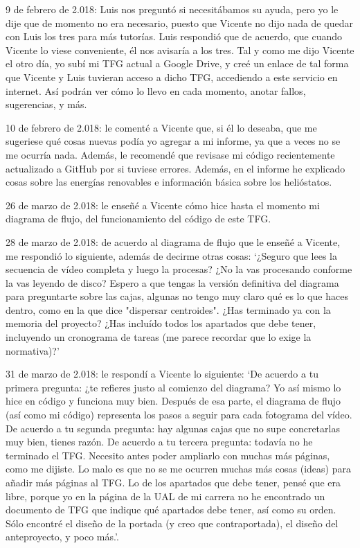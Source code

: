 \documentclass[12pt]{article}
\begin{document}
9 de febrero de 2.018: Luis nos preguntó si necesitábamos su ayuda, pero yo le dije que de momento no era necesario, puesto que Vicente no dijo nada de quedar con Luis los tres para más tutorías. Luis respondió que de acuerdo, que cuando Vicente lo viese conveniente, él nos avisaría a los tres. Tal y como me dijo Vicente el otro día, yo subí mi TFG actual a Google Drive, y creé un enlace de tal forma que Vicente y Luis tuvieran acceso a dicho TFG, accediendo a este servicio en internet. Así podrán ver cómo lo llevo en cada momento, anotar fallos, sugerencias, y más.

10 de febrero de 2.018: le comenté a Vicente que, si él lo deseaba, que me sugeriese qué cosas nuevas podía yo agregar a mi informe, ya que a veces no se me ocurría nada. Además, le recomendé que revisase mi código recientemente actualizado a GitHub por si tuviese errores. Además, en el informe he explicado cosas sobre las energías renovables e información básica sobre los helióstatos.

26 de marzo de 2.018: le enseñé a Vicente cómo hice hasta el momento mi diagrama de flujo, del funcionamiento del código de este TFG.

28 de marzo de 2.018: de acuerdo al diagrama de flujo que le enseñé a Vicente, me respondió lo siguiente, además de decirme otras cosas: ‘¿Seguro que lees la secuencia de vídeo completa y luego la procesas? ¿No la vas procesando conforme la vas leyendo de disco? Espero a que tengas la versión definitiva del diagrama para preguntarte sobre las cajas, algunas no tengo muy claro qué es lo que haces dentro, como en la que dice "dispersar centroides". ¿Has terminado ya con la memoria del proyecto? ¿Has incluído todos los apartados que debe tener, incluyendo un cronograma de tareas (me parece recordar que lo exige la normativa)?’

31 de marzo de 2.018: le respondí a Vicente lo siguiente: ‘De acuerdo a tu primera pregunta: ¿te refieres justo al comienzo del diagrama? Yo así mismo lo hice en código y funciona muy bien. Después de esa parte, el diagrama de flujo (así como mi código) representa los pasos a seguir para cada fotograma del vídeo. De acuerdo a tu segunda pregunta: hay algunas cajas que no supe concretarlas muy bien, tienes razón. De acuerdo a tu tercera pregunta: todavía no he terminado el TFG. Necesito antes poder ampliarlo con muchas más páginas, como me dijiste. Lo malo es que no se me ocurren muchas más cosas (ideas) para añadir más páginas al TFG. Lo de los apartados que debe tener, pensé que era libre, porque yo en la página de la UAL de mi carrera no he encontrado un documento de TFG que indique qué apartados debe tener, así como su orden. Sólo encontré el diseño de la portada (y creo que contraportada), el diseño del anteproyecto, y poco más.’.
\end{document}
